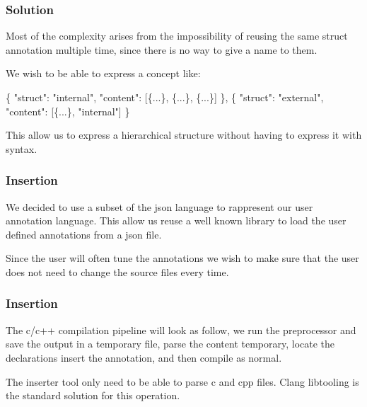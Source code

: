 \documentclass{beamer}
\begin{document}
\begin{frame}[fragile]
	\frametitle{Solution}
	\begin{block}{}
	Most of the complexity arises from the impossibility of reusing the same struct annotation multiple time, since there is no way to give a name to them.

	We wish to be able to express a concept like:
	\end{block}

	\begin{alertblock}{}
	\begin{semiverbatim}	
		\{
		\quad "struct": "internal",
		\quad "content": [\{...\}, \{...\}, \{...\}]
		\},
		\{
		\quad "struct": "external",
		\quad "content": [\{...\}, "internal"]
		\}
	\end{semiverbatim}
	\end{alertblock}

	\begin{block}{}
	This allow us to express a hierarchical structure without having to express it with syntax.
	\end{block}

\end{frame}
\begin{frame}[fragile]
	\frametitle{Insertion}
	\begin{block}{}
	We decided to use a subset of the json language to rappresent our user annotation language.
	This allow us reuse a well known library to load the user defined annotations from a json file.
	\end{block}
	\begin{block}{}
		Since the user will often tune the annotations we wish to make sure that the user does not need to change the source files every time. 
	\end{block}

\end{frame}
\begin{frame}[fragile]
	\frametitle{Insertion}
	\begin{block}{}
		The c/c++ compilation pipeline will look as follow, we run the preprocessor and save the output in a temporary file, parse the content temporary, locate the declarations insert the annotation, and then compile as normal. 
	\end{block}
	
	\begin{block}{}
		The inserter tool only need to be able to parse c and cpp files. Clang libtooling is the standard solution for this operation.
	\end{block}

\end{frame}
\end{document}
